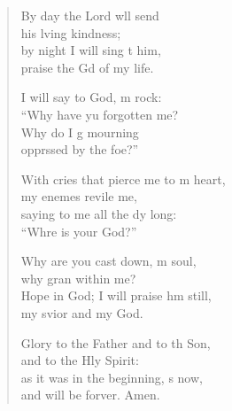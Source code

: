 \begin{verse}
\begin{patverse}
By day the Lord w\pointup{\i}ll send\Med\\
his lving kindness;\\
by night I will sing t him,\Med\\
praise the Gd of my life.

I will say to God, m rock:\Med\\
“Why have yu forgotten me?\\
Why do I g mourning\Med\\
opprssed by the foe?”

With cries that pierce me to m heart,\Med\\
my enemes revile me,\\
saying to me all the dy long:\Med\\
“Whre is your God?”

Why are you cast down, m soul,\Med\\
why gran within me?\\
Hope in God; I will praise h\pointup{\i}m still,\Med\\
my svior and my God.

Glory to the Father and to th Son,\Med\\
and to the Hly Spirit:\\
as it was in the beginning, \pointup{\i}s now,\Med\\
and will be forver. Amen. 
  \end{patverse}
\end{verse}
